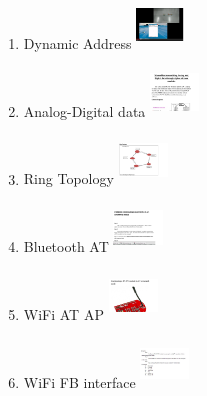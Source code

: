 \documentclass[table,10pt,blue]{beamer}	%
\begin{document}
\begin{frame}
\begin{columns}[c]
\begin{enumerate} \color{red}
\item Dynamic Address \includegraphics[width=1.3cm,height=1.3cm,keepaspectratio]{dynamic}
\item Analog-Digital data \includegraphics[width=1.3cm,height=1.3cm,keepaspectratio]{AD}
\item Ring Topology \includegraphics[width=1.3cm,height=1.3cm,keepaspectratio]{ring}
\item Bluetooth AT \includegraphics[width=1.3cm,height=1.3cm,keepaspectratio]{bluetooth}
\item WiFi AT AP \includegraphics[width=1.3cm,height=1.3cm,keepaspectratio]{wifi}
\item WiFi FB interface \includegraphics[width=1.3cm,height=1.3cm,keepaspectratio]{wfb} \color{black}
\end{enumerate}
\end{columns}
\end{frame}

\end{document}
